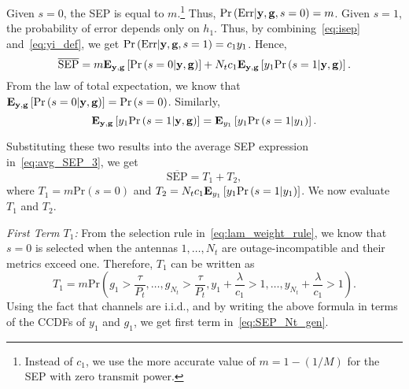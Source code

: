\documentclass[12pt,draftcls,peerreview,onecolumn]{IEEEtran}
\newcommand{\brac}[1]{\left({#1}\right)}
\newcommand{\explow}[2]{{\bf{E}}_{#1}\left[{#2}\right]}
\newcommand{\prob}[1]{\text{Pr}\brac{#1}}
\newcommand{\given}{\arrowvert}
\newcommand{\SEP}{\text{SEP}}
\newcommand{\y}{\mathbf{y}}
\newcommand{\nx}{{0}}
\newcommand{\lam}{\lambda}
\newcommand{\Err}{{\text{Err}}}
\newcommand{\termone}{T_1}
\newcommand{\termtwo}{T_2}
\newcommand{\Nt}{{N_t}}
\newcommand{\Pt}{{P_t}}
\newcommand{\such}{h}
\newcommand{\puch}{g}
\newcommand{\hk}[1]{{\such_{#1}}}
\newcommand{\gk}[1]{{\puch_{#1}}}
\newcommand{\g}{\mathbf{\puch}}
\newcommand{\itau}{\tau}
\newcommand{\cone}{c_{1}}
\newcommand{\m}{\cone}
\newcommand{\taubypt}{\frac{\itau}{\Pt}}
\newcommand{\gkgrtaubypt}[1]{{\gk{#1}}>\taubypt}
\newcommand{\lambym}{\frac{\lam}{\m}}
\newcommand{\yk}[1]{y_{#1}}
\newcommand{\zerosep}{m}
\newcommand{\avgSEP}{\overline{\SEP}}
\begin{document}
Given $s=0$, the SEP is equal to $\zerosep$.\footnote{Instead of $c_1$, we use the more accurate value of $\zerosep=1-\left( 1/M\right) $ for the SEP with zero transmit power.}  Thus, $\prob{\Err\given\y,\g,s=\nx}=\zerosep$. Given $s=1$, the probability of error depends only on $\hk{1}$. Thus, by combining~\eqref{eq:isep} and~\eqref{eq:yi_def}, we get $\prob{\Err\given\y,\g,s=1}=\m \yk{1}$. Hence,
\begin{equation}
\label{eq:avg_SEP_3}
\avgSEP  = \zerosep \explow{\y,\g}{\prob{s=\nx\given\y,\g}} + \Nt\m\explow{\y,\g}{\yk{1}\prob{s=1\given\y,\g}}.
\end{equation}
From the law of total expectation, we know that $\explow{\y,\g}{\prob{s=\nx\given\y,\g}} = \prob{s = 0}$.
Similarly, 
\begin{equation}
\label{eq:avg_sep_3_one}
\explow{\y,\g}{\yk{1}\prob{s = 1\given \y,\g} } = \explow{\yk{1}}{\yk{1} \prob{s = 1\given \yk{1}}  }.
\end{equation}

Substituting these  two results into the average SEP expression in~\eqref{eq:avg_SEP_3}, we get
%
\begin{equation}
\label{eq:avg_SEP_4}
\avgSEP  = \termone + \termtwo,
\end{equation}
%
where $\termone=\zerosep \prob{s = 0}$ and $\termtwo=\Nt\m \explow{\yk{1}}{ \yk{1}\prob{s = 1\given \yk{1}}}$. We now evaluate $\termone$ and $\termtwo$.

{\em First Term $\termone$:}
From the selection rule in~\eqref{eq:lam_weight_rule}, we know that ${s=0}$ is selected when the antennas $1,\ldots,\Nt$ are outage-incompatible and their metrics exceed one. Therefore, $\termone$ can be written as 
\begin{equation}
\termone = \zerosep\prob{\gkgrtaubypt{1},\dots,\gkgrtaubypt{\Nt}, \yk{1}\!+\!\lambym >1,\ldots,\yk{\Nt}\!+\!\lambym >1}.
\label{eq:termone_a}
\end{equation}
%
Using the fact that channels are i.i.d., and by writing the above formula in terms of the CCDFs of $\yk{1}$ and $\gk{1}$, we get first term in~\eqref{eq:SEP_Nt_gen}.
\end{document}
